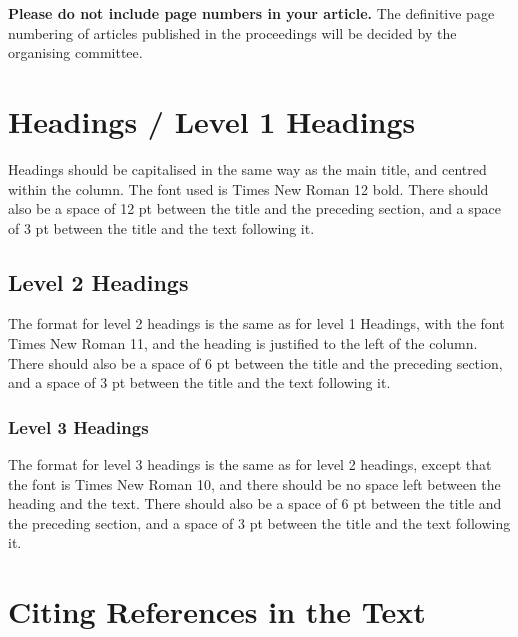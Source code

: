 \documentclass{lrec}
\begin{document}
\textbf{Please do not include page numbers in your article.} The definitive page
numbering of articles published in the proceedings will be decided by the
organising committee.

\section{Headings / Level 1 Headings}

Headings should be capitalised in the same way as the main title, and centred
within the column. The font used is Times New Roman 12 bold. There should
also be a space of 12 pt between the title and the preceding section, and
a space of 3 pt between the title and the text following it.

\subsection{Level 2 Headings}

The format for level 2 headings is the same as for level 1 Headings, with the
font Times New Roman 11, and the heading is justified to the left of the column.
There should also be a space of 6 pt between the title and the preceding
section, and a space of 3 pt between the title and the text following it.

\subsubsection{Level 3 Headings}

The format for level 3 headings is the same as for level 2 headings, except that
the font is Times New Roman 10, and there should be no space left between the
heading and the text. There should also be a space of 6 pt between the title and
the preceding section, and a space of 3 pt between the title and the text
following it.

%

\section{Citing References in the Text}
\end{document}
